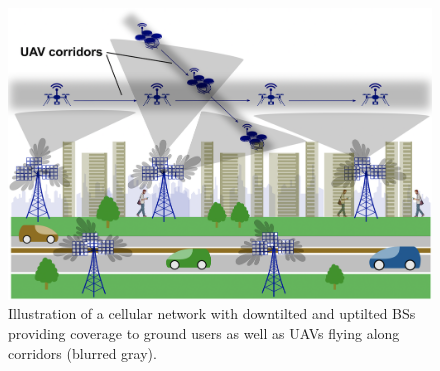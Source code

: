 \begin{figure}
\centering
\includegraphics[width=\figwidth]{
Figures/figureCorridors_v03.png}
\caption{Illustration of a cellular network with downtilted and uptilted BSs providing coverage to ground users as well as UAVs flying along corridors (blurred gray).}
\label{fig:illustration}
\end{figure}